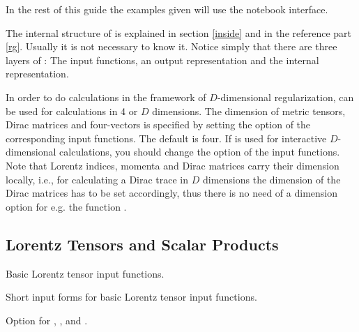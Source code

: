 In the rest of this guide the examples given will use the notebook interface.

The internal structure of \fc
is explained in section \ref{inside} and in the
reference part \ref{rg}. Usually it is not necessary to know it.
Notice simply that there are three layers of \fc: The input functions,
an output representation and the internal representation.

In order to do calculations in the framework of $D$-dimensional
regularization, \fc can be used for  calculations
in 4 or $D$
dimensions.
The dimension of  metric tensors, Dirac matrices and  four-vectors
is specified by setting the option  of the corresponding
input functions.
The default is four. If \fc is  used for interactive
$D$-dimensional calculations, you should change the option of the
input functions. 
Note that Lorentz indices, momenta and
Dirac matrices carry their dimension
locally, i.e., for calculating a Dirac trace in $D$ dimensions the
dimension of the Dirac matrices has to be set accordingly, thus
there is no need of a dimension option for e.g. the function .

\subsection{Lorentz Tensors and Scalar Products}

 {Basic Lorentz tensor input functions.}

 {Short input forms for basic Lorentz tensor input functions.}

 {Option for , ,  and  .}

